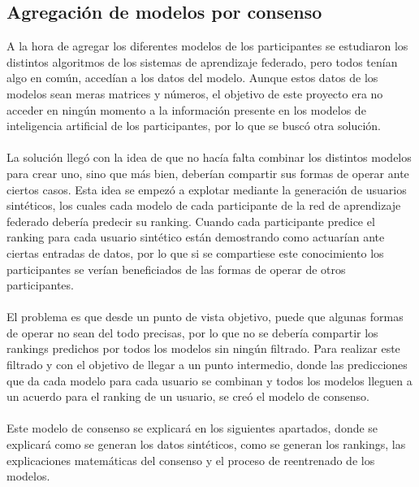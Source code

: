 \subsection{Agregación de modelos por consenso}\label{Consenso}
A la hora de agregar los diferentes modelos de los participantes se estudiaron los distintos algoritmos de los sistemas de aprendizaje federado, pero todos tenían algo en común, accedían a los datos del modelo. Aunque estos datos de los modelos sean meras matrices y números, el objetivo de este proyecto era no acceder en ningún momento a la información presente en los modelos de inteligencia artificial de los participantes, por lo que se buscó otra solución.
\\ \\
La solución llegó con la idea de que no hacía falta combinar los distintos modelos para crear uno, sino que más bien, deberían compartir sus formas de operar ante ciertos casos. Esta idea se empezó a explotar mediante la generación de usuarios sintéticos, los cuales cada modelo de cada participante de la red de aprendizaje federado debería predecir su ranking. Cuando cada participante predice el ranking para cada usuario sintético están demostrando como actuarían ante ciertas entradas de datos, por lo que si se compartiese este conocimiento los participantes se verían beneficiados de las formas de operar de otros participantes.
\\ \\
El problema es que desde un punto de vista objetivo, puede que algunas formas de operar no sean del todo precisas, por lo que no se debería compartir los rankings predichos por todos los modelos sin ningún filtrado. Para realizar este filtrado y con el objetivo de llegar a un punto intermedio, donde las predicciones que da cada modelo para cada usuario se combinan y todos los modelos lleguen a un acuerdo para el ranking de un usuario, se creó el modelo de consenso. 
\\ \\
Este modelo de consenso se explicará en los siguientes apartados, donde se explicará como se generan los datos sintéticos, como se generan los rankings, las explicaciones matemáticas del consenso y el proceso de reentrenado de los modelos.

